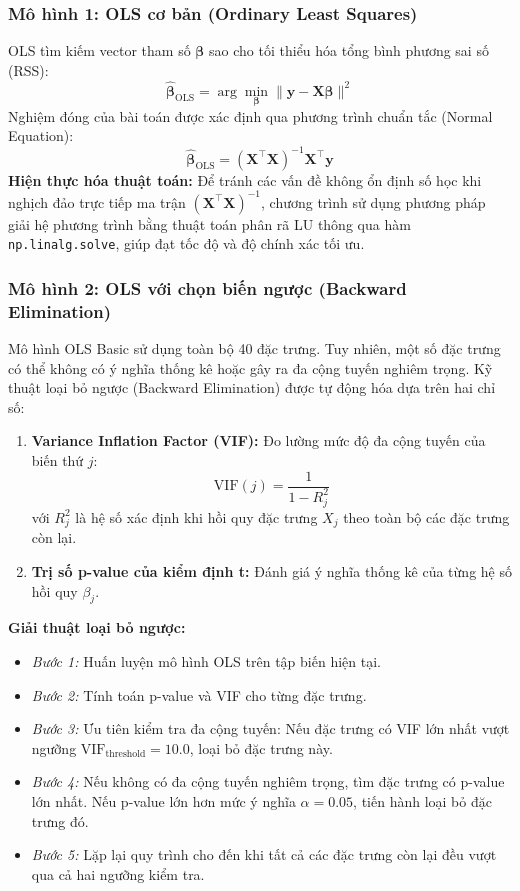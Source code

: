 \documentclass[12pt,a4paper]{article}
\begin{document}
\subsubsection{Mô hình 1: OLS cơ bản (Ordinary Least Squares)}
OLS tìm kiếm vector tham số $\boldsymbol{\beta}$ sao cho tối thiểu hóa tổng bình phương sai số (RSS):
\begin{equation}
    \hat{\boldsymbol{\beta}}_{\text{OLS}} = \arg\min_{\boldsymbol{\beta}} \| \mathbf{y} - \mathbf{X}\boldsymbol{\beta} \|^2
\end{equation}
Nghiệm đóng của bài toán được xác định qua phương trình chuẩn tắc (Normal Equation):
\begin{equation}
    \hat{\boldsymbol{\beta}}_{\text{OLS}} = (\mathbf{X}^\top\mathbf{X})^{-1} \mathbf{X}^\top\mathbf{y}
\end{equation}
\textbf{Hiện thực hóa thuật toán:} Để tránh các vấn đề không ổn định số học khi nghịch đảo trực tiếp ma trận $(\mathbf{X}^\top\mathbf{X})^{-1}$, chương trình sử dụng phương pháp giải hệ phương trình bằng thuật toán phân rã LU thông qua hàm \texttt{np.linalg.solve}, giúp đạt tốc độ và độ chính xác tối ưu.

\subsubsection{Mô hình 2: OLS với chọn biến ngược (Backward Elimination)}
Mô hình OLS Basic sử dụng toàn bộ 40 đặc trưng. Tuy nhiên, một số đặc trưng có thể không có ý nghĩa thống kê hoặc gây ra đa cộng tuyến nghiêm trọng. Kỹ thuật loại bỏ ngược (Backward Elimination) được tự động hóa dựa trên hai chỉ số:
\begin{enumerate}
    \item \textbf{Variance Inflation Factor (VIF):} Đo lường mức độ đa cộng tuyến của biến thứ $j$:
    \begin{equation}
        \text{VIF}(j) = \frac{1}{1 - R^2_j}
    \end{equation}
    với $R^2_j$ là hệ số xác định khi hồi quy đặc trưng $X_j$ theo toàn bộ các đặc trưng còn lại.
    \item \textbf{Trị số p-value của kiểm định t:} Đánh giá ý nghĩa thống kê của từng hệ số hồi quy $\beta_j$.
\end{enumerate}
\textbf{Giải thuật loại bỏ ngược:}
\begin{itemize}
    \item \textit{Bước 1:} Huấn luyện mô hình OLS trên tập biến hiện tại.
    \item \textit{Bước 2:} Tính toán p-value và VIF cho từng đặc trưng.
    \item \textit{Bước 3:} Ưu tiên kiểm tra đa cộng tuyến: Nếu đặc trưng có VIF lớn nhất vượt ngưỡng $\text{VIF}_{\text{threshold}} = 10.0$, loại bỏ đặc trưng này.
    \item \textit{Bước 4:} Nếu không có đa cộng tuyến nghiêm trọng, tìm đặc trưng có p-value lớn nhất. Nếu p-value lớn hơn mức ý nghĩa $\alpha = 0.05$, tiến hành loại bỏ đặc trưng đó.
    \item \textit{Bước 5:} Lặp lại quy trình cho đến khi tất cả các đặc trưng còn lại đều vượt qua cả hai ngưỡng kiểm tra.
\end{itemize}
\end{document}
